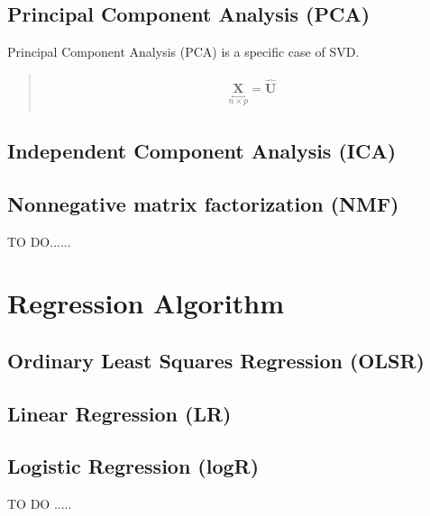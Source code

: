 \documentclass[letterpaper,11pt,english]{sphinxmanual}
\def\bX{\mathbf{X}}
\def\hU{\mathbf{\hat{U}}}
\begin{document}

\section{Principal Component Analysis (PCA)}
\label{dim:principal-component-analysis-pca}\label{dim:index-2}
Principal Component Analysis (PCA) is a specific case of SVD.
\begin{quote}
\label{dim:equation-test}\begin{gather}
\begin{split}\underbracket{\bX}_{n\times p} =\hU\end{split}\label{dim-test}
\end{gather}\end{quote}


\section{Independent Component Analysis (ICA)}
\label{dim:independent-component-analysis-ica}\label{dim:index-3}

\section{Nonnegative matrix factorization (NMF)}
\label{dim:index-4}\label{dim:nonnegative-matrix-factorization-nmf}
TO DO......


\chapter{Regression Algorithm}
\label{regression:regression-algorithm}\label{regression::doc}\label{regression:regression}

\section{Ordinary Least Squares Regression (OLSR)}
\label{regression:ordinary-least-squares-regression-olsr}

\section{Linear Regression (LR)}
\label{regression:linear-regression-lr}

\section{Logistic Regression (logR)}
\label{regression:logistic-regression-logr}
TO DO .....
\end{document}
